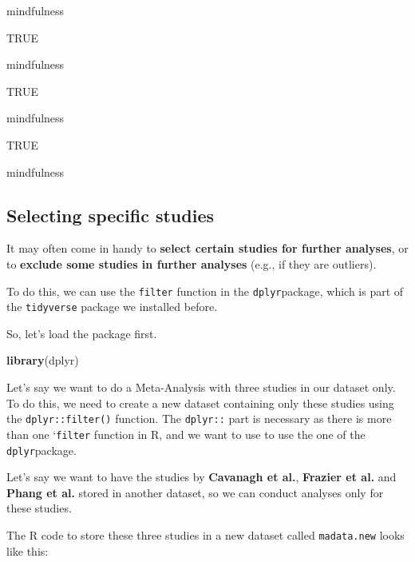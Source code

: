 \documentclass[]{book}
\newenvironment{Shaded}{\begin{snugshade}}{\end{snugshade}}
\newcommand{\KeywordTok}[1]{\textcolor[rgb]{0.13,0.29,0.53}{\textbf{#1}}}
\newcommand{\NormalTok}[1]{#1}
\newcommand{\OperatorTok}[1]{\textcolor[rgb]{0.81,0.36,0.00}{\textbf{#1}}}
\newcommand{\StringTok}[1]{\textcolor[rgb]{0.31,0.60,0.02}{#1}}
\begin{document}
mindfulness

TRUE

mindfulness

TRUE

mindfulness

TRUE

mindfulness

\hypertarget{select}{%
\subsection{Selecting specific studies}\label{select}}

It may often come in handy to \textbf{select certain studies for further analyses}, or to \textbf{exclude some studies in further analyses} (e.g., if they are outliers).

To do this, we can use the \texttt{filter} function in the \texttt{dplyr}package, which is part of the \texttt{tidyverse} package we installed before.

So, let's load the package first.

\begin{Shaded}
\begin{Highlighting}[]
\KeywordTok{library}\NormalTok{(dplyr)}
\end{Highlighting}
\end{Shaded}

Let's say we want to do a Meta-Analysis with three studies in our dataset only. To do this, we need to create a new dataset containing only these studies using the \texttt{dplyr::filter()} function. The \texttt{dplyr::} part is necessary as there is more than one `\texttt{filter} function in R, and we want to use to use the one of the \texttt{dplyr}package.

Let's say we want to have the studies by \textbf{Cavanagh et al.}, \textbf{Frazier et al.} and \textbf{Phang et al.} stored in another dataset, so we can conduct analyses only for these studies.

The R code to store these three studies in a new dataset called \texttt{madata.new} looks like this:

\begin{Shaded}
\end{Shaded}
\end{document}
